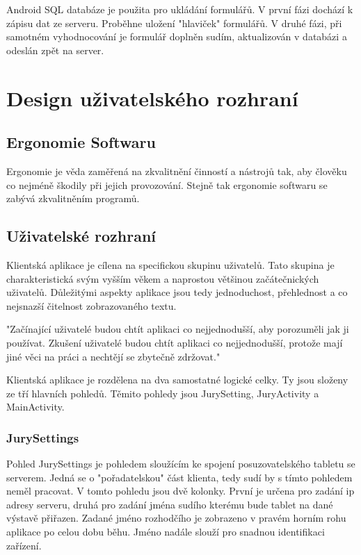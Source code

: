 \documentclass[11pt, oneside]{fithesis2}
\begin{document}
Android SQL databáze je použita pro ukládání formulářů. V první fázi dochází k zápisu dat ze serveru. Proběhne uložení "hlaviček" formulářů.
V druhé fázi, při samotném vyhodnocování je formulář doplněn sudím, aktualizován v databázi a odeslán zpět na server.

\chapter{Design uživatelského rozhraní}
\section{Ergonomie Softwaru}
Ergonomie je věda zaměřená na zkvalitnění činností a nástrojů tak, aby člověku co nejméně škodily při jejich provozování.
Stejně tak ergonomie softwaru se zabývá zkvalitněním programů.

\section{Uživatelské rozhraní}
Klientská aplikace je cílena na specifickou skupinu uživatelů. Tato skupina je charakteristická svým vyšším věkem a naprostou většinou začátečnických uživatelů.
Důležitými aspekty aplikace jsou tedy jednoduchost, přehlednost a co nejsnazší čitelnost zobrazovaného textu. 

"Začínající uživatelé budou chtít aplikaci co nejjednodušší, aby porozuměli jak ji používat.
Zkušení uživatelé budou chtít aplikaci co nejjednodušší, protože mají jiné věci na práci a nechtějí se zbytečně zdržovat."\cite[str. 43]{hoekman}

Klientská aplikace je rozdělena na dva samostatné logické celky. Ty jsou složeny ze tří hlavních pohledů. Těmito pohledy jsou JurySetting, JuryActivity a MainActivity.

\subsection{JurySettings}
Pohled JurySettings je pohledem sloužícím ke spojení posuzovatelského tabletu se serverem. Jedná se o "pořadatelskou" část klienta, tedy sudí by s tímto pohledem neměl pracovat.
V tomto pohledu jsou dvě kolonky. První je určena pro zadání ip adresy serveru, druhá pro zadání jména sudího kterému bude tablet na dané výstavě přiřazen.
Zadané jméno rozhodčího je zobrazeno v pravém horním rohu aplikace po celou dobu běhu. Jméno nadále slouží pro snadnou identifikaci zařízení.
\end{document}
